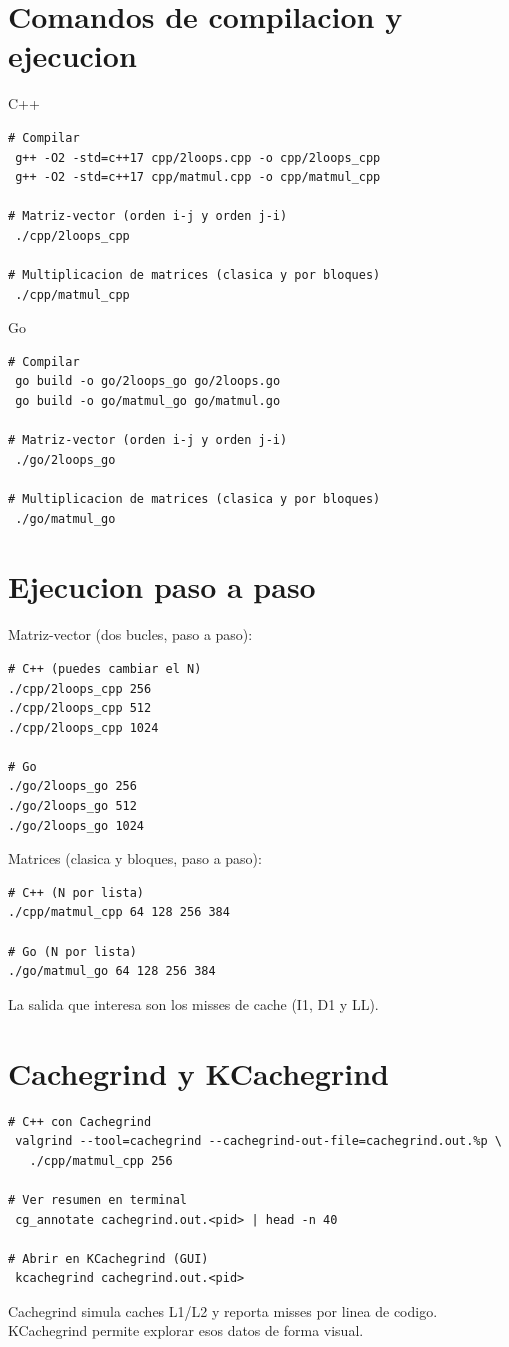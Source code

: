 \documentclass[11pt]{article}
\begin{document}
\section*{Comandos de compilacion y ejecucion}
C++
\begin{verbatim}
# Compilar
 g++ -O2 -std=c++17 cpp/2loops.cpp -o cpp/2loops_cpp
 g++ -O2 -std=c++17 cpp/matmul.cpp -o cpp/matmul_cpp

# Matriz-vector (orden i-j y orden j-i)
 ./cpp/2loops_cpp

# Multiplicacion de matrices (clasica y por bloques)
 ./cpp/matmul_cpp
\end{verbatim}

Go
\begin{verbatim}
# Compilar
 go build -o go/2loops_go go/2loops.go
 go build -o go/matmul_go go/matmul.go

# Matriz-vector (orden i-j y orden j-i)
 ./go/2loops_go

# Multiplicacion de matrices (clasica y por bloques)
 ./go/matmul_go
\end{verbatim}

\section*{Ejecucion paso a paso}
Matriz-vector (dos bucles, paso a paso):
\begin{verbatim}
# C++ (puedes cambiar el N)
./cpp/2loops_cpp 256
./cpp/2loops_cpp 512
./cpp/2loops_cpp 1024

# Go
./go/2loops_go 256
./go/2loops_go 512
./go/2loops_go 1024
\end{verbatim}

Matrices (clasica y bloques, paso a paso):
\begin{verbatim}
# C++ (N por lista)
./cpp/matmul_cpp 64 128 256 384

# Go (N por lista)
./go/matmul_go 64 128 256 384
\end{verbatim}
La salida que interesa son los misses de cache (I1, D1 y LL). 

\section*{Cachegrind y KCachegrind}
\begin{verbatim}
# C++ con Cachegrind
 valgrind --tool=cachegrind --cachegrind-out-file=cachegrind.out.%p \
   ./cpp/matmul_cpp 256

# Ver resumen en terminal
 cg_annotate cachegrind.out.<pid> | head -n 40

# Abrir en KCachegrind (GUI)
 kcachegrind cachegrind.out.<pid>
\end{verbatim}
Cachegrind simula caches L1/L2 y reporta misses por linea de codigo.
KCachegrind permite explorar esos datos de forma visual.
\end{document}

